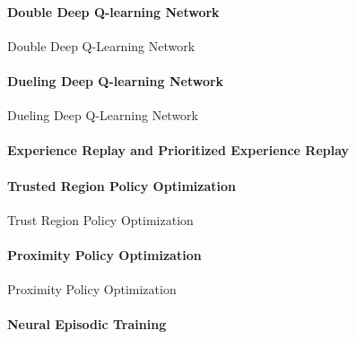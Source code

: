 \documentclass[12pt,a4paper]{article}
\begin{document}
\paragraph{Double Deep Q-learning Network} Double Deep Q-Learning Network
\paragraph{Dueling Deep Q-learning Network} Dueling Deep Q-Learning Network
\paragraph{Experience Replay and Prioritized Experience Replay} 
\paragraph{Trusted Region Policy Optimization} Trust Region Policy Optimization
\paragraph{Proximity Policy Optimization} Proximity Policy Optimization
\paragraph{Neural Episodic Training} \cite{Pritzel2017Neural}

\ifx\allfiles\undefined


\end{document}
